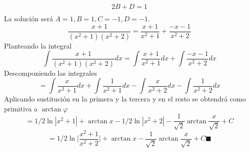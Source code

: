 \documentclass[10pt,twoside]{SelfArx} %
\begin{document}
\begin{enumerate}
\begin{enumerate}
\begin{enumerate}
\[\begin{array}{cccc}
2B+D=1\\
\end{array}
 \]
 La solución será $ A=1, B=1, C=-1, D=-1 $.
 \[ \dfrac{x+1}{(x^{2}+1)(x^{2}+2)}=\dfrac{x+1}{x^{2}+1}+\dfrac{-x-1}{x^{2}+2}  \]
 Planteando la integral
 \begin{equation}
  \int\dfrac{x+1}{(x^{2}+1)(x^{2}+2)}dx=\int\dfrac{x+1}{x^{2}+1}dx+\int\dfrac{-x-1}{x^{2}+2}dx
 \end{equation}
 Descomponiendo las integrales
 \begin{equation}
=\int\dfrac{x}{x^{2}+1}dx+\int\dfrac{1}{x^{2}+1}dx-\int\dfrac{x}{x^{2}+2}dx-\int\dfrac{1}{x^{2}+2}dx
 \end{equation}
 Aplicando sustitución en la primera y la tercera y en el resto se obtendrá como primitiva a $ \arctan \varphi $
 \begin{equation}
 =1/2\ln|x^{2}+1|+\arctan x-1/2\ln|x^{2}+2|-\dfrac{1}{\sqrt{2}}\arctan\dfrac{x}{\sqrt{2}}+C
 \end{equation}
 \begin{equation}
 =1/2\ln\bigg|\dfrac{x^{2}+1}{x^{2}+2}\bigg|+\arctan x-\dfrac{1}{\sqrt{2}}\arctan\dfrac{x}{\sqrt{2}}+C\blacksquare
 \end{equation}
 
\end{enumerate}

\end{enumerate}





\end{enumerate}
\end{document}
